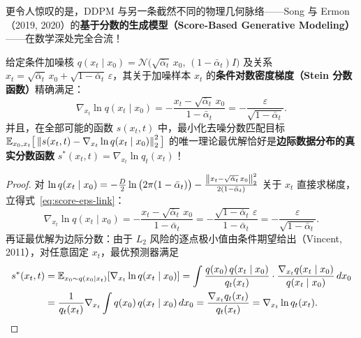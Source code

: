 更令人惊叹的是，DDPM 与另一条截然不同的物理几何脉络——Song 与 Ermon（2019, 2020）的\textbf{基于分数的生成模型（Score-Based Generative Modeling）}——在数学深处完全合流！

\begin{thmBox}
\begin{proposition}
\label{prop:dsm}
给定条件加噪核 $q(x_t \mid x_0) = \mathcal{N}\!\big(\sqrt{\bar{\alpha}_t}\,x_0,\, (1 - \bar{\alpha}_t) I\big)$ 及关系 $x_t = \sqrt{\bar{\alpha}_t}\,x_0 + \sqrt{1 - \bar{\alpha}_t}\,\varepsilon$，其关于加噪样本 $x_t$ 的\textbf{条件对数密度梯度（Stein 分数函数）}精确满足：
\begin{equation}
  \nabla_{x_t} \ln q(x_t \mid x_0)
  = -\frac{x_t - \sqrt{\bar{\alpha}_t}\, x_0}{1 - \bar{\alpha}_t}
  = -\frac{\varepsilon}{\sqrt{1 - \bar{\alpha}_t}}.
  \label{eq:score-eps-link}
\end{equation}
并且，在全部可能的函数 $s(x_t, t)$ 中，最小化去噪分数匹配目标 $\mathbb{E}_{x_0, x_t}\big[\left\|s(x_t, t) - \nabla_{x_t}\ln q(x_t \mid x_0)\right\|_2^2\big]$ 的唯一理论最优解恰好是\textbf{边际数据分布的真实分数函数} $s^*(x_t, t) = \nabla_{x_t} \ln q_t(x_t)$！
\end{proposition}
\begin{proof}
对 $\ln q(x_t \mid x_0) = -\frac{D}{2}\ln\big(2\pi(1-\bar{\alpha}_t)\big) - \frac{\left\|x_t - \sqrt{\bar{\alpha}_t}\, x_0\right\|_2^2}{2(1-\bar{\alpha}_t)}$ 关于 $x_t$ 直接求梯度，立得式~\eqref{eq:score-eps-link}：
\[
  \nabla_{x_t}\ln q(x_t \mid x_0)
  = -\frac{x_t - \sqrt{\bar{\alpha}_t}\, x_0}{1 - \bar{\alpha}_t}
  = -\frac{\sqrt{1 - \bar{\alpha}_t}\,\varepsilon}{1 - \bar{\alpha}_t}
  = -\frac{\varepsilon}{\sqrt{1 - \bar{\alpha}_t}}.
\]
再证最优解为边际分数：由于 $L_2$ 风险的逐点极小值由条件期望给出（Vincent, 2011），对任意固定 $x_t$，最优预测器满足
\begin{align*}
  s^*(x_t, t)
  &= \mathbb{E}_{x_0 \sim q(x_0 \mid x_t)}\!\left[\nabla_{x_t} \ln q(x_t \mid x_0)\right]
   = \int \frac{q(x_0)\, q(x_t \mid x_0)}{q_t(x_t)} \cdot \frac{\nabla_{x_t} q(x_t \mid x_0)}{q(x_t \mid x_0)}\, dx_0 \\
  &= \frac{1}{q_t(x_t)} \nabla_{x_t} \int q(x_0)\, q(x_t \mid x_0)\, dx_0
   = \frac{\nabla_{x_t} q_t(x_t)}{q_t(x_t)}
   = \nabla_{x_t} \ln q_t(x_t).
\end{align*}
\end{proof}
\end{thmBox}


